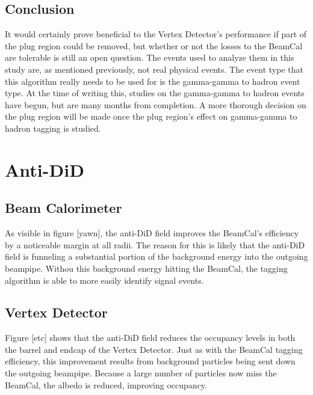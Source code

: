 \documentclass{report}
\begin{document}
            \subsection{Conclusion} 
                 It would certainly prove beneficial to the Vertex Detector's performance if part of the plug region could be removed, but whether or not the losses to the BeamCal are tolerable is still an open question. The events used to analyze them in this study are, as mentioned previously, not real physical events. The event type that this algorithm really needs to be used for is the gamma-gamma to hadron event type. At the time of writing this, studies on the gamma-gamma to hadron events have begun, but are many months from completion. A more thorough decision on the plug region will be made once the plug region's effect on gamma-gamma to hadron tagging is studied.

        
        \section{Anti-DiD}
            \subsection{Beam Calorimeter}
                As visible in figure [yawn], the anti-DiD field improves the BeamCal's efficiency by a noticeable margin at all radii. The reason for this is likely that the anti-DiD field is funneling a substantial portion of the background energy into the outgoing beampipe. Withou this background energy hitting the BeamCal, the tagging algorithm is able to more easily identify signal events.

            \subsection{Vertex Detector}
                Figure [etc] shows that the anti-DiD field reduces the occupancy levels in both the barrel and endcap of the Vertex Detector. Just as with the BeamCal tagging efficiency, this improvement results from background particles being sent down the outgoing beampipe. Because a large number of particles now miss the BeamCal, the albedo is reduced, improving occupancy.
\end{document}
